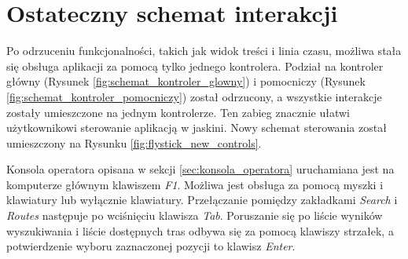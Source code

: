 \section{Ostateczny schemat interakcji}
\label{sec:schemat_interakcji}
Po odrzuceniu funkcjonalności, takich jak widok treści i linia czasu, możliwa stała się obsługa aplikacji za pomocą tylko jednego kontrolera. Podział na kontroler główny (Rysunek \ref{fig:schemat_kontroler_glowny}) i pomocniczy (Rysunek \ref{fig:schemat_kontroler_pomocniczy}) został odrzucony, a wszystkie interakcje zostały umieszczone na jednym kontrolerze. Ten zabieg znacznie ułatwi użytkownikowi sterowanie aplikacją w jaskini. Nowy schemat sterowania został umieszczony na Rysunku \ref{fig:flystick_new_controls}.


Konsola operatora opisana w sekcji \ref{sec:konsola_operatora} uruchamiana jest na komputerze głównym klawiszem \textit{F1}. Możliwa jest obsługa za pomocą myszki i klawiatury lub wyłącznie klawiatury. Przełączanie pomiędzy zakładkami \textit{Search} i \textit{Routes} następuje po wciśnięciu klawisza \textit{Tab}. Poruszanie się po liście wyników wyszukiwania i liście dostępnych tras odbywa się za pomocą klawiszy strzałek, a potwierdzenie wyboru zaznaczonej pozycji to klawisz \textit{Enter}.
